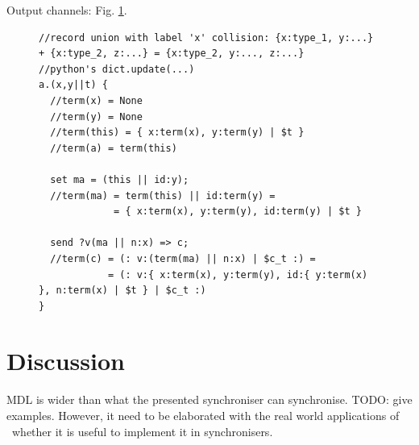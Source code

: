 Output channels: Fig. \ref{b}.
\begin{figure}[h!]
\begin{lstlisting}[frame=single]
//record union with label 'x' collision: {x:type_1, y:...} + {x:type_2, z:...} = {x:type_2, y:..., z:...}
//python's dict.update(...)
a.(x,y||t) {
  //term(x) = None
  //term(y) = None
  //term(this) = { x:term(x), y:term(y) | $t }
  //term(a) = term(this)

  set ma = (this || id:y);
  //term(ma) = term(this) || id:term(y) =
             = { x:term(x), y:term(y), id:term(y) | $t }

  send ?v(ma || n:x) => c;
  //term(c) = (: v:(term(ma) || n:x) | $c_t :) =
            = (: v:{ x:term(x), y:term(y), id:{ y:term(x) }, n:term(x) | $t } | $c_t :)
}
\end{lstlisting}
\label{b}
\end{figure}


\section{Discussion}
MDL is wider than what the presented synchroniser can synchronise. TODO: give examples. However, it need to be elaborated with the real world applications of \ak\ whether it is useful to implement it in synchronisers.
